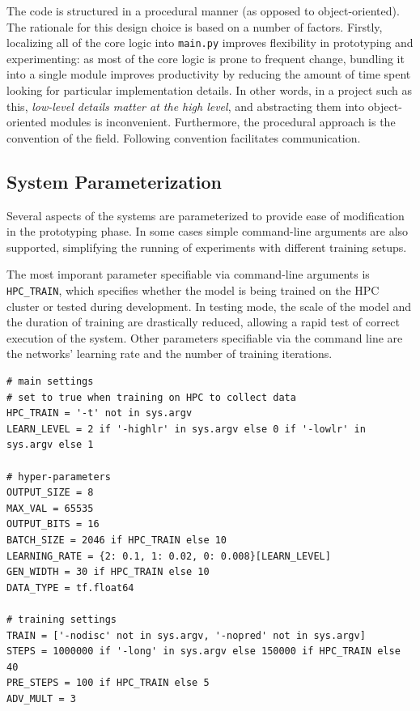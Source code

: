 \documentclass[12pt, titlepage]{report}
\theoremstyle{definition}
\begin{document}
The code is structured in a procedural manner (as opposed to object-oriented). The rationale for this design choice is based on a number of factors. Firstly, localizing all of the core logic into \texttt{main.py} improves flexibility in prototyping and experimenting: as most of the core logic is prone to frequent change, bundling it into a single module improves productivity by reducing the amount of time spent looking for particular implementation details. In other words, in a project such as this, \emph{low-level details matter at the high level}, and abstracting them into object-oriented modules is inconvenient. Furthermore, the procedural approach is the convention of the field. Following convention facilitates communication.



\subsection{System Parameterization}
Several aspects of the systems are parameterized to provide ease of modification in the prototyping phase. In some cases simple command-line arguments are also supported, simplifying the running of experiments with different training setups. 

The most imporant parameter specifiable via command-line arguments is \texttt{HPC_TRAIN}, which specifies whether the model is being trained on the HPC cluster or tested during development. In testing mode, the scale of the model and the duration of training are drastically reduced, allowing a rapid test of correct execution of the system. Other parameters specifiable via the command line are the networks' learning rate and the number of training iterations.

\begin{verbatim}
# main settings
# set to true when training on HPC to collect data
HPC_TRAIN = '-t' not in sys.argv
LEARN_LEVEL = 2 if '-highlr' in sys.argv else 0 if '-lowlr' in sys.argv else 1

# hyper-parameters
OUTPUT_SIZE = 8
MAX_VAL = 65535
OUTPUT_BITS = 16
BATCH_SIZE = 2046 if HPC_TRAIN else 10
LEARNING_RATE = {2: 0.1, 1: 0.02, 0: 0.008}[LEARN_LEVEL]
GEN_WIDTH = 30 if HPC_TRAIN else 10
DATA_TYPE = tf.float64

# training settings
TRAIN = ['-nodisc' not in sys.argv, '-nopred' not in sys.argv]
STEPS = 1000000 if '-long' in sys.argv else 150000 if HPC_TRAIN else 40
PRE_STEPS = 100 if HPC_TRAIN else 5
ADV_MULT = 3
\end{verbatim}
\end{document}
